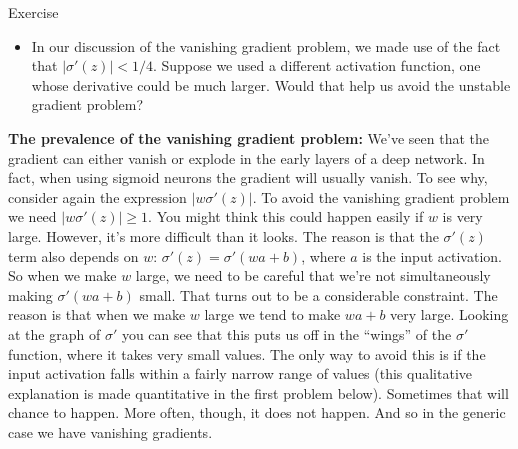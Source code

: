 \begin{exerciseBox}{Exercise}


\begin{itemize}

\item In our discussion of the vanishing gradient problem, we made use of the fact that $|\sigma'(z)| < 1/4$. Suppose we used a different activation function, one whose derivative could be much larger. Would that help us avoid the unstable gradient problem?

\end{itemize}


\textbf{The prevalence of the vanishing gradient problem:} We've seen that the gradient can either vanish or explode in the early layers of a deep network. In fact, when using sigmoid neurons the gradient will usually vanish. To see why, consider again the expression $|w \sigma'(z)|$. To avoid the vanishing gradient problem we need $|w \sigma'(z)| \geq 1$. You might think this could happen easily if $w$ is very large. However, it's more difficult than it looks. The reason is that the $\sigma'(z)$ term also depends on $w$: $\sigma'(z) = \sigma'(wa +b)$, where $a$ is the input activation. So when we make $w$ large, we need to be careful that we're not simultaneously making $\sigma'(wa+b)$ small. That turns out to be a considerable constraint. The reason is that when we make $w$ large we tend to make $wa+b$ very large. Looking at the graph of $\sigma'$ you can see that this puts us off in the ``wings'' of the $\sigma'$ function, where it takes very small values. The only way to avoid this is if the input activation falls within a fairly narrow range of values (this qualitative explanation is made quantitative in the first problem below). Sometimes that will chance to happen. More often, though, it does not happen. And so in the generic case we have vanishing gradients.

\end{exerciseBox}



